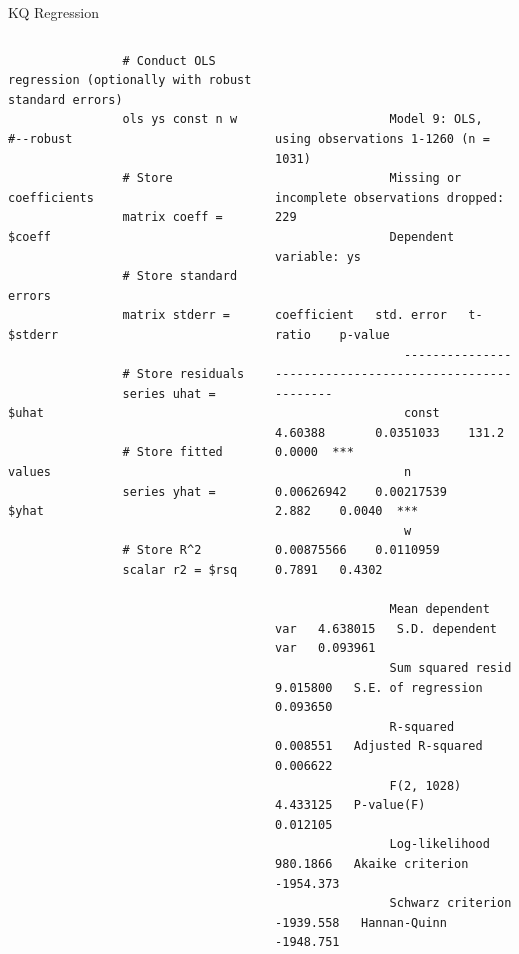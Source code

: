 \documentclass{beamer}[11pt]
\begin{document}
\begin{frame}[fragile]{KQ Regression}
	\begin{columns}[T] %
		\scriptsize
		\begin{column}{.45\textwidth}
			\begin{verbatim}
				# Conduct OLS regression (optionally with robust standard errors)
				ols ys const n w  #--robust

				# Store coefficients
				matrix coeff = $coeff

				# Store standard errors
				matrix stderr = $stderr

				# Store residuals
				series uhat = $uhat

				# Store fitted values
				series yhat = $yhat

				# Store R^2
				scalar r2 = $rsq
			\end{verbatim}
		\end{column}

		\begin{column}{.55\textwidth}
			\tiny
			\begin{verbatim}



				Model 9: OLS, using observations 1-1260 (n = 1031)
				Missing or incomplete observations dropped: 229
				Dependent variable: ys

							 coefficient   std. error   t-ratio    p-value
				  --------------------------------------------------------
				  const      4.60388       0.0351033    131.2      0.0000  ***
				  n          0.00626942    0.00217539     2.882    0.0040  ***
				  w          0.00875566    0.0110959      0.7891   0.4302

				Mean dependent var   4.638015   S.D. dependent var   0.093961
				Sum squared resid    9.015800   S.E. of regression   0.093650
				R-squared            0.008551   Adjusted R-squared   0.006622
				F(2, 1028)           4.433125   P-value(F)           0.012105
				Log-likelihood       980.1866   Akaike criterion    -1954.373
				Schwarz criterion   -1939.558   Hannan-Quinn        -1948.751
			\end{verbatim}
	  \end{column}
	\end{columns}
\end{frame}
\end{document}
